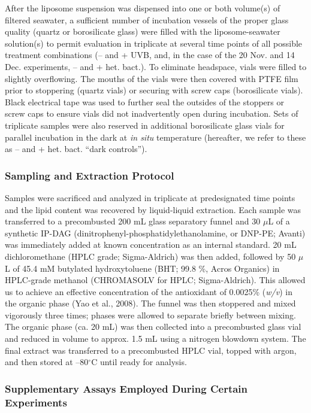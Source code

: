After the liposome suspension was dispensed into one or both volume(s) of filtered seawater, a sufficient number of incubation vessels of the proper glass quality (quartz or borosilicate glass) were filled with the liposome-seawater solution(s) to permit evaluation in triplicate at several time points of all possible treatment combinations (-- and + UVB, and, in the case of the 20 Nov. and 14 Dec. experiments, -- and + het. bact.). To eliminate headspace, vials were filled to slightly overflowing. The mouths of the vials were then covered with PTFE film prior to stoppering (quartz vials) or securing with screw caps (borosilicate vials). Black electrical tape was used to further seal the outsides of the stoppers or screw caps to ensure vials did not inadvertently open during incubation. Sets of triplicate samples were also reserved in additional borosilicate glass vials for parallel incubation in the dark at \emph{in situ} temperature (hereafter, we refer to these as -- and + het. bact. ``dark controls'').

\subsubsection{Sampling and Extraction Protocol}

Samples were sacrificed and analyzed in triplicate at predesignated time points and the lipid content was recovered by liquid-liquid extraction. Each sample was transferred to a precombusted 200 mL glass separatory funnel and 30 $\mu$L of a synthetic IP-DAG (dinitrophenyl-phosphatidylethanolamine, or DNP-PE; Avanti) was immediately added at known concentration as an internal standard. 20 mL dichloromethane (HPLC grade; Sigma-Aldrich) was then added, followed by 50 $\mu$L of 45.4 mM butylated hydroxytoluene (BHT; 99.8 \%, Acros Organics) in HPLC-grade methanol (CHROMASOLV for HPLC; Sigma-Aldrich). This allowed us to achieve an effective concentration of the antioxidant of 0.0025\% (\emph{w/v}) in the organic phase (Yao et al., 2008). The funnel was then stoppered and mixed vigorously three times; phases were allowed to separate briefly between mixing. The organic phase (ca. 20 mL) was then collected into a precombusted glass vial and reduced in volume to approx. 1.5 mL using a nitrogen blowdown system. The final extract was transferred to a precombusted HPLC vial, topped with argon, and then stored at --80$^{\circ}$C until ready for analysis.

\subsubsection{Supplementary Assays Employed During Certain Experiments}

